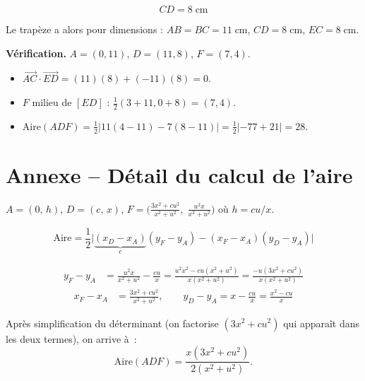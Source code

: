 ﻿\documentclass[a4paper,12pt]{article}
\begin{document}
\[
  \boxed{\;CD = 8\;\text{cm}\;}
\]

Le trap\`eze a alors pour dimensions :
$AB = BC = 11\;\text{cm}$,\; $CD = 8\;\text{cm}$,\; $EC = 8\;\text{cm}$.

\bigskip
\textbf{V\'erification.}
$A = (0,11)$, $D = (11,8)$, $F = (7,4)$.
\begin{itemize}
  \item $\overrightarrow{AC}\cdot\overrightarrow{ED}
    = (11)(8) + (-11)(8) = 0$.\;\checkmark
  \item $F$ milieu de $[ED]$ : $\tfrac{1}{2}(3+11, 0+8) = (7,4)$.\;\checkmark
  \item Aire$(ADF)
    = \tfrac{1}{2}|11(4-11) - 7(8-11)|
    = \tfrac{1}{2}|{-77+21}| = 28$.\;\checkmark
\end{itemize}

\section*{Annexe -- D\'etail du calcul de l'aire}

$A = (0,\,h)$, $D = (c,\,x)$, $F = \bigl(\frac{3x^2+cu^2}{x^2+u^2},\;\frac{u^2 x}{x^2+u^2}\bigr)$
o\`u $h = cu/x$.

\[
  \text{Aire} = \frac{1}{2}\bigl|
  \underbrace{(x_D - x_A)}_{c}(y_F - y_A) - (x_F - x_A)(y_D - y_A)\bigr|
\]

\begin{align*}
  y_F - y_A &= \frac{u^2 x}{x^2+u^2} - \frac{cu}{x}
  = \frac{u^2 x^2 - cu(x^2+u^2)}{x(x^2+u^2)}
  = \frac{-u(3x^2 + cu^2)}{x(x^2+u^2)}
\end{align*}
\begin{align*}
  x_F - x_A &= \frac{3x^2 + cu^2}{x^2+u^2},\qquad
  y_D - y_A = x - \frac{cu}{x} = \frac{x^2 - cu}{x}
\end{align*}

Apr\`es simplification du d\'eterminant (on factorise $(3x^2+cu^2)$
qui appara\^it dans les deux termes), on arrive \`a~:
\[
  \text{Aire}(ADF) = \frac{x(3x^2 + cu^2)}{2(x^2+u^2)}.
\]
\end{document}
